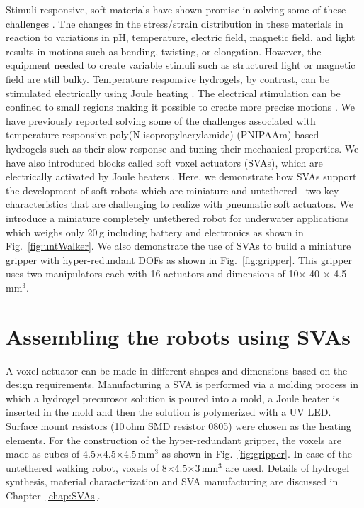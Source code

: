 Stimuli-responsive, soft materials have shown promise in solving some of these challenges \cite{Steele2018, Stuart2010,White2013}. The changes in the stress/strain distribution in these materials in reaction to variations in pH, temperature, electric field, magnetic field, and light results in motions such as bending, twisting, or elongation. However, the equipment needed to create variable stimuli such as structured light \cite{Palagi2016} or magnetic field \cite{Kim2018} are still bulky. Temperature responsive hydrogels, by contrast, can be stimulated electrically using Joule heating \cite{Yu2013}. The electrical stimulation can be confined to small regions making it possible to create more precise motions \cite{Richter2009}. We have previously reported solving some of the challenges associated with temperature responsive poly(N-isopropylacrylamide) (PNIPAAm) based hydrogels such as their slow response and tuning their mechanical properties. We have also introduced blocks called soft voxel actuators (SVAs), which are electrically activated by Joule heaters \cite{Khodambashi2021}. Here, we demonstrate how SVAs support the development of soft robots which are miniature and untethered --two key characteristics that are challenging to realize with pneumatic soft actuators. We introduce a miniature completely untethered robot for underwater applications which weighs only 20\,g including battery and electronics as shown in Fig.~\ref{fig:untWalker}. We also demonstrate the use of SVAs to build a miniature gripper with hyper-redundant DOFs as shown in Fig.~\ref{fig:gripper}. This gripper uses two manipulators each with 16 actuators and dimensions of 10$\times$ 40 $\times$ 4.5\,mm$^3$. 

	
\section{Assembling the robots using SVAs}
A voxel actuator can be made in different shapes and dimensions based on the design requirements. Manufacturing a SVA is performed via a molding process in which a hydrogel precurosor solution is poured into a mold, a Joule heater is inserted in the mold and then the solution is polymerized with a UV LED. Surface mount  resistors  (10\,ohm  SMD  resistor  0805) were chosen as the heating elements. For the construction of the hyper-redundant gripper, the voxels are made as cubes of 4.5$\times$4.5$\times$4.5\,mm$^3$ as shown in Fig.~\ref{fig:gripper}. In case of the untethered walking robot, voxels of 8$\times$4.5$\times$3\,mm$^3$ are used. Details of hydrogel synthesis, material characterization and SVA manufacturing are discussed in Chapter~\ref{chap:SVAs}.

